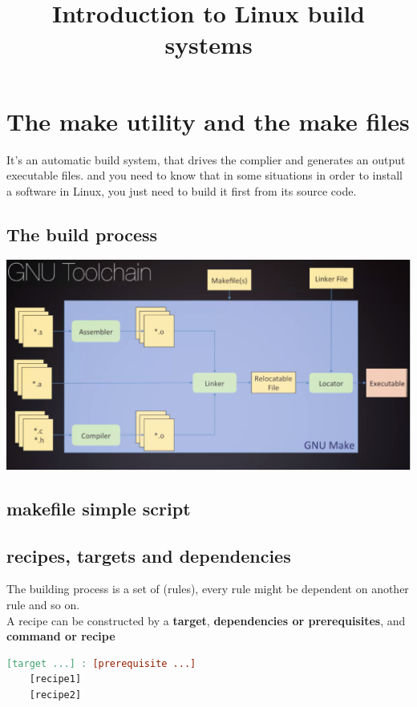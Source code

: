 \documentclass{article}
\title{\textbf{Introduction to Linux build systems}}
\author{}
\date{}
\begin{document}
\maketitle
\tableofcontents{}
\section{The make utility and the make files}
It's an automatic build system, that drives the complier and generates an output executable files. and you need to know that in some situations in order to install a software in Linux, you just need to build it first from its source code.

\subsection{The build process}

\begin{center}
\includegraphics[scale=0.50]{./resources/imgs/build-process.png}
\end{center}

\subsection{makefile simple script}

\subsection{recipes, targets and dependencies}
The building process is a set of (rules), every rule might be dependent on another rule and so on.\\
A recipe can be constructed by a \textbf{target}, \textbf{dependencies or prerequisites}, and \textbf{command or recipe}

\begin{lstlisting}[language=make, caption=make rule structure]
[target ...] : [prerequisite ...]
    [recipe1]
    [recipe2]
\end{lstlisting}
\end{document}
